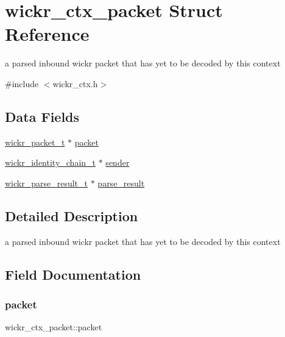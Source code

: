 \hypertarget{structwickr__ctx__packet}{}\section{wickr\+\_\+ctx\+\_\+packet Struct Reference}
\label{structwickr__ctx__packet}


a parsed inbound wickr packet that has yet to be decoded by this context  




{\ttfamily \#include $<$wickr\+\_\+ctx.\+h$>$}

\subsection*{Data Fields}
\begin{DoxyCompactItemize}
\item 
\mbox{\hyperlink{structwickr__packet}{wickr\+\_\+packet\+\_\+t}} $\ast$ \mbox{\hyperlink{structwickr__ctx__packet_a0cdbc84b6fcc6115b8ddf21b235cc645}{packet}}
\item 
\mbox{\hyperlink{structwickr__identity__chain}{wickr\+\_\+identity\+\_\+chain\+\_\+t}} $\ast$ \mbox{\hyperlink{structwickr__ctx__packet_ac57d2b0f48fc3dad5b72d408e30b7b8b}{sender}}
\item 
\mbox{\hyperlink{structwickr__parse__result}{wickr\+\_\+parse\+\_\+result\+\_\+t}} $\ast$ \mbox{\hyperlink{structwickr__ctx__packet_a7bc4643a99b787536ee8b7505412ecce}{parse\+\_\+result}}
\end{DoxyCompactItemize}


\subsection{Detailed Description}
a parsed inbound wickr packet that has yet to be decoded by this context 

\subsection{Field Documentation}
\mbox{\label{structwickr__ctx__packet_a0cdbc84b6fcc6115b8ddf21b235cc645}} 
\subsubsection{\texorpdfstring{packet}{packet}}
{\footnotesize\ttfamily wickr\+\_\+ctx\+\_\+packet\+::packet}

